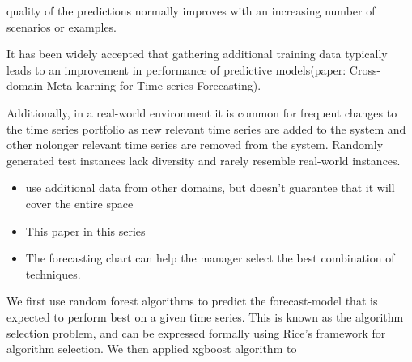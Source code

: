 \documentclass[]{article}
\begin{document}
quality of the predictions normally improves with an increasing number
of scenarios or examples.

It has been widely accepted that gathering additional training data
typically leads to an improvement in performance of predictive
models(paper: Cross-domain Meta-learning for Time-series Forecasting).

Additionally, in a real-world environment it is common for frequent
changes to the time series portfolio as new relevant time series are
added to the system and other nolonger relevant time series are removed
from the system. Randomly generated test instances lack diversity and
rarely resemble real-world instances.

\begin{itemize}
\item
  use additional data from other domains, but doesn't guarantee that it
  will cover the entire space
\item
  This paper in this series
\item
  The forecasting chart can help the manager select the best combination
  of techniques.
\end{itemize}

We first use random forest algorithms to predict the forecast-model that
is expected to perform best on a given time series. This is known as the
algorithm selection problem, and can be expressed formally using Rice's
framework for algorithm selection. We then applied xgboost algorithm to
\end{document}
